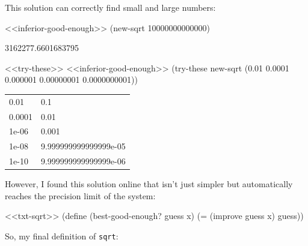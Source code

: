 \documentclass[
]{article}
\newenvironment{Shaded}{}{}
\newcommand{\DecValTok}[1]{\textcolor[rgb]{0.25,0.63,0.44}{#1}}
\newcommand{\ExtensionTok}[1]{#1}
\newcommand{\FloatTok}[1]{\textcolor[rgb]{0.25,0.63,0.44}{#1}}
\newcommand{\FunctionTok}[1]{\textcolor[rgb]{0.02,0.16,0.49}{#1}}
\newcommand{\NormalTok}[1]{#1}
\newcommand{\OperatorTok}[1]{\textcolor[rgb]{0.40,0.40,0.40}{#1}}
\begin{document}
This solution can correctly find small and large numbers:

\begin{Shaded}
\begin{Highlighting}[numbers=left,,]
\NormalTok{\textless{}\textless{}inferior{-}good{-}enough\textgreater{}\textgreater{}}
\NormalTok{(new{-}sqrt }\DecValTok{10000000000000}\NormalTok{)}
\end{Highlighting}
\end{Shaded}

3162277.6601683795

\hypertarget{EX1-7-t2}{%
\label{EX1-7-t2}}%
\begin{Shaded}
\begin{Highlighting}[numbers=left,,]
\NormalTok{\textless{}\textless{}try{-}these\textgreater{}\textgreater{}}
\NormalTok{\textless{}\textless{}inferior{-}good{-}enough\textgreater{}\textgreater{}}
\NormalTok{(try{-}these new{-}sqrt \textquotesingle{}(}\FloatTok{0.01} \FloatTok{0.0001} \FloatTok{0.000001} \FloatTok{0.00000001} \FloatTok{0.0000000001}\NormalTok{))}
\end{Highlighting}
\end{Shaded}

\begin{longtable}[]{@{}ll@{}}
\toprule
\endhead
0.01 & 0.1 \\
0.0001 & 0.01 \\
1e-06 & 0.001 \\
1e-08 & 9.999999999999999e-05 \\
1e-10 & 9.999999999999999e-06 \\
\bottomrule
\end{longtable}

However, I found this solution online that isn't just simpler but
automatically reaches the precision limit of the system:

\hypertarget{new-good-enough}{%
\label{new-good-enough}}%
\begin{Shaded}
\begin{Highlighting}[numbers=left,,]
\NormalTok{\textless{}\textless{}txt{-}sqrt\textgreater{}\textgreater{}}
\NormalTok{(}\ExtensionTok{define}\FunctionTok{ }\NormalTok{(best{-}good{-}enough? guess x)}
\NormalTok{   (}\OperatorTok{=}\NormalTok{ (improve guess x) guess))}
\end{Highlighting}
\end{Shaded}

So, my final definition of \texttt{sqrt}:
\end{document}
